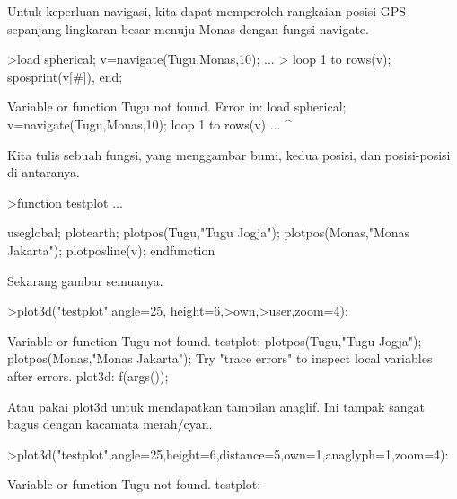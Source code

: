 \documentclass[a4paper,10pt]{article}
\begin{document}
\begin{eulernotebook}
\begin{eulercomment}
\begin{eulercomment}
\begin{eulercomment}
\begin{eulercomment}
\begin{eulercomment}
\begin{eulercomment}
\begin{eulercomment}
\begin{eulercomment}
\begin{eulercomment}
\begin{eulercomment}
\begin{eulercomment}
\begin{eulercomment}
\begin{eulercomment}
\begin{eulercomment}
\begin{eulercomment}
\begin{eulercomment}
\begin{eulercomment}
\begin{eulercomment}
\begin{euleroutput}
\end{euleroutput}
\begin{eulercomment}
Untuk keperluan navigasi, kita dapat memperoleh rangkaian posisi GPS sepanjang lingkaran besar
menuju Monas dengan fungsi navigate.
\end{eulercomment}
\begin{eulerprompt}
>load spherical; v=navigate(Tugu,Monas,10); ...
>  loop 1 to rows(v); sposprint(v[#]), end;
\end{eulerprompt}
\begin{euleroutput}
  Variable or function Tugu not found.
  Error in:
  load spherical; v=navigate(Tugu,Monas,10);   loop 1 to rows(v) ...
                                 ^
\end{euleroutput}
\begin{eulercomment}
Kita tulis sebuah fungsi, yang menggambar bumi, kedua posisi, dan posisi-posisi di antaranya.
\end{eulercomment}
\begin{eulerprompt}
>function testplot ...
\end{eulerprompt}
\begin{eulerudf}
  useglobal;
  plotearth;
  plotpos(Tugu,"Tugu Jogja"); plotpos(Monas,"Monas Jakarta");
  plotposline(v);
  endfunction
\end{eulerudf}
\begin{eulercomment}
Sekarang gambar semuanya.
\end{eulercomment}
\begin{eulerprompt}
>plot3d("testplot",angle=25, height=6,>own,>user,zoom=4):
\end{eulerprompt}
\begin{euleroutput}
  Variable or function Tugu not found.
  testplot:
      plotpos(Tugu,"Tugu Jogja"); plotpos(Monas,"Monas Jakarta");
  Try "trace errors" to inspect local variables after errors.
  plot3d:
      f(args());
\end{euleroutput}
\begin{eulercomment}
Atau pakai plot3d untuk mendapatkan tampilan anaglif. Ini tampak sangat bagus dengan
kacamata merah/cyan.
\end{eulercomment}
\begin{eulerprompt}
>plot3d("testplot",angle=25,height=6,distance=5,own=1,anaglyph=1,zoom=4):
\end{eulerprompt}
\begin{euleroutput}
  Variable or function Tugu not found.
  testplot:

\end{euleroutput}
\end{eulercomment}
\end{eulercomment}
\end{eulercomment}
\end{eulercomment}
\end{eulercomment}
\end{eulercomment}
\end{eulercomment}
\end{eulercomment}
\end{eulercomment}
\end{eulercomment}
\end{eulercomment}
\end{eulercomment}
\end{eulercomment}
\end{eulercomment}
\end{eulercomment}
\end{eulercomment}
\end{eulercomment}
\end{eulercomment}
\end{eulernotebook}
\end{document}
